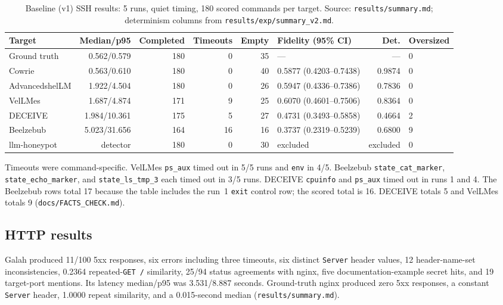 \documentclass[a4paper,11pt]{article}
\begin{document}
\begin{table}[ht]
\centering
\caption{Baseline (v1) SSH results: 5 runs, quiet timing, 180 scored commands
per target. Source: \texttt{results/summary.md}; determinism columns from
\texttt{results/exp/summary\_v2.md}.}
\label{tab:v1-ssh}
\scriptsize
\begin{tabularx}{\textwidth}{l r r r r l r l}
\toprule
Target & Median/p95 & Comple\-ted & Time\-outs & Empty & Fidelity (95\% CI) & Det. & Oversized \\
\midrule
Ground truth & 0.562/0.579 & 180 & 0 & 35 & --- & --- & 0 \\
Cowrie & 0.563/0.610 & 180 & 0 & 40 & 0.5877 (0.4203--0.7438) & 0.9874 & 0 \\
AdvancedshelLM & 1.922/4.504 & 180 & 0 & 26 & 0.5947 (0.4336--0.7386) & 0.7836 & 0 \\
VelLMes & 1.687/4.874 & 171 & 9 & 25 & 0.6070 (0.4601--0.7506) & 0.8364 & 0 \\
DECEIVE & 1.984/10.361 & 175 & 5 & 27 & 0.4731 (0.3493--0.5858) & 0.4664 & 2 \\
Beelzebub & 5.023/31.656 & 164 & 16 & 16 & 0.3737 (0.2319--0.5239) & 0.6800 & 9 \\
llm-honeypot & detector & 180 & 0 & 30 & excluded & excluded & 0 \\
\bottomrule
\end{tabularx}
\end{table}

Timeouts were command-specific. VelLMes \texttt{ps\_aux} timed out in 5/5 runs
and \texttt{env} in 4/5. Beelzebub \texttt{state\_cat\_marker},
\texttt{state\_echo\_marker}, and \texttt{state\_ls\_tmp\_3} each timed out in
3/5 runs. DECEIVE \texttt{cpuinfo} and \texttt{ps\_aux} timed out in runs 1
and 4. The Beelzebub rows total 17 because the table includes the run~1
\texttt{exit} control row; the scored total is 16. DECEIVE totals 5 and VelLMes
totals 9 (\texttt{docs/FACTS\_CHECK.md}).

\subsection{HTTP results}

Galah produced 11/100 5xx responses, six errors including three timeouts, six
distinct \texttt{Server} header values, 12 header-name-set inconsistencies,
0.2364 repeated-\texttt{GET /} similarity, 25/94 status agreements with nginx,
five documentation-example secret hits, and 19 target-port mentions. Its
latency median/p95 was 3.531/8.887 seconds. Ground-truth nginx produced zero
5xx responses, a constant \texttt{Server} header, 1.0000 repeat similarity,
and a 0.015-second median (\texttt{results/summary.md}).
\end{document}
